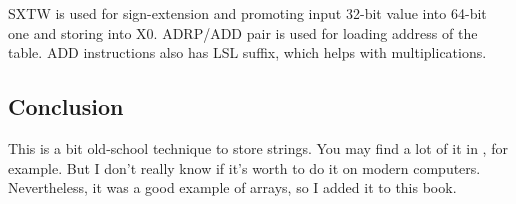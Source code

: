 SXTW is used for sign-extension and promoting input 32-bit value into 64-bit one and storing into X0.
ADRP/ADD pair is used for loading address of the table.
ADD instructions also has LSL suffix, which helps with multiplications.

\subsection{Conclusion}

This is a bit old-school technique to store strings.
You may find a lot of it in \oracle, for example.
But I don't really know if it's worth to do it on modern computers.
Nevertheless, it was a good example of arrays, so I added it to this book.
\fi
